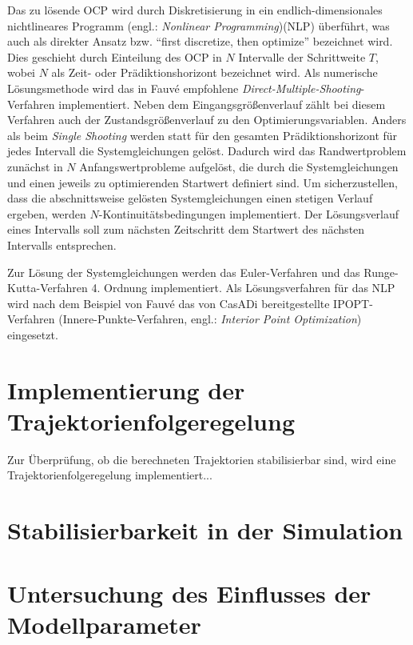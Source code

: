 Das zu lösende OCP wird durch Diskretisierung in ein endlich-dimensionales nichtlineares Programm (engl.: \textit{Nonlinear Programming})(NLP) überführt, was auch als direkter Ansatz bzw. "`first discretize, then optimize"' bezeichnet wird. Dies geschieht durch Einteilung des OCP in $N$ Intervalle der Schrittweite $T$, wobei $N$ als Zeit- oder Prädiktionshorizont bezeichnet wird. Als numerische Lösungsmethode wird das in Fauvé \cite{fauve} empfohlene \textit{Direct-Multiple-Shooting}-Verfahren implementiert. Neben dem Eingangsgrößenverlauf zählt bei diesem Verfahren auch der Zustandsgrößenverlauf zu den Optimierungsvariablen. Anders als beim \textit{Single Shooting} werden statt für den gesamten Prädiktionshorizont für jedes Intervall die Systemgleichungen gelöst. Dadurch wird das Randwertproblem zunächst in $N$ Anfangswertprobleme aufgelöst, die durch die Systemgleichungen und einen jeweils zu optimierenden Startwert definiert sind. Um sicherzustellen, dass die abschnittsweise gelösten Systemgleichungen einen stetigen Verlauf ergeben, werden $N$-Kontinuitätsbedingungen implementiert. Der Lösungsverlauf eines Intervalls soll zum nächsten Zeitschritt dem Startwert des nächsten Intervalls entsprechen. 

Zur Lösung der Systemgleichungen werden das Euler-Verfahren und das Runge-Kutta-Verfahren 4. Ordnung implementiert. Als Lösungsverfahren für das NLP wird nach dem Beispiel von Fauvé \cite{fauve}  das von CasADi bereitgestellte IPOPT-Verfahren (Innere-Punkte-Verfahren, engl.: \textit{Interior Point Optimization}) eingesetzt.


\section{Implementierung der Trajektorienfolgeregelung}

Zur Überprüfung, ob die berechneten Trajektorien stabilisierbar sind, wird eine Trajektorienfolgeregelung implementiert...


\section{Stabilisierbarkeit in der Simulation}

\section{Untersuchung des Einflusses der Modellparameter}\label{sec:trjparamtest}

